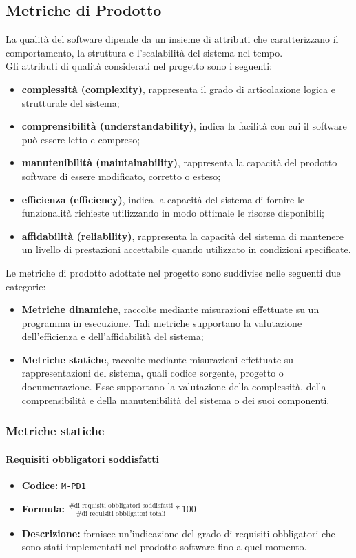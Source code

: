 \documentclass[a4paper,12pt]{article}
\begin{document}
\subsection{Metriche di Prodotto}
La qualità del software dipende da un insieme di attributi che caratterizzano il comportamento, la struttura e l’scalabilità del sistema nel tempo.\\
Gli attributi di qualità considerati nel progetto sono i seguenti:
\begin{itemize}
    \item \textbf{complessità (complexity)}, rappresenta il grado di articolazione logica e strutturale del sistema;
    \item \textbf{comprensibilità (understandability)}, indica la facilità con cui il software può essere letto e compreso;
    \item \textbf{manutenibilità (maintainability)}, rappresenta la capacità del prodotto software di essere modificato, corretto o esteso;
    \item \textbf{efficienza (efficiency)}, indica la capacità del sistema di fornire le funzionalità richieste utilizzando in modo ottimale le risorse disponibili;
    \item \textbf{affidabilità (reliability)}, rappresenta la capacità del sistema di mantenere un livello di prestazioni accettabile quando utilizzato in condizioni specificate.
\end{itemize}
Le metriche di prodotto adottate nel progetto sono suddivise nelle seguenti due categorie:
\begin{itemize}
    \item \textbf{Metriche dinamiche}, raccolte mediante misurazioni effettuate su un programma in esecuzione. Tali metriche supportano la valutazione dell’efficienza e dell’affidabilità del sistema;
    \item \textbf{Metriche statiche}, raccolte mediante misurazioni effettuate su rappresentazioni del sistema, quali codice sorgente, progetto o documentazione. Esse supportano la valutazione della complessità, della comprensibilità e della manutenibilità del sistema o dei suoi componenti.
\end{itemize}

\subsubsection{Metriche statiche}

\paragraph{Requisiti obbligatori soddisfatti}
\begin{itemize}
    \item \textbf{Codice:} \texttt{M-PD1}
    \item \textbf{Formula:} $\frac{\text{\# di requisiti obbligatori soddisfatti}}{\text{\# di requisiti obbligatori totali}}*100$
    \item \textbf{Descrizione:} fornisce un'indicazione del grado di requisiti obbligatori che sono stati implementati nel prodotto software fino a quel momento.
\end{itemize}
\end{document}
